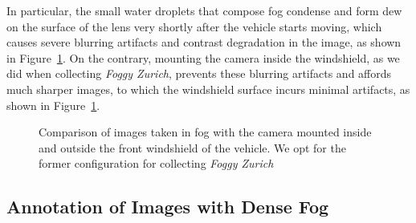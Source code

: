 \documentclass[twocolumn]{svjour3}          \smartqed  \usepackage{graphicx}
\begin{document}
In particular, the small water droplets that compose fog condense and form dew on the surface of the lens very shortly after the vehicle starts moving, which causes severe blurring artifacts and contrast degradation in the image, as shown in Figure~\ref{fig:windshield}. On the contrary, mounting the camera inside the windshield, as we did when collecting \emph{Foggy Zurich}, prevents these blurring artifacts and affords much sharper images, to which the windshield surface incurs minimal artifacts, as shown in Figure~\ref{fig:windshield}.

\begin{figure}
  \centering
  \hfil
  \caption{Comparison of images taken in fog with the camera mounted \protect{} inside and \protect{} outside the front windshield of the vehicle. We opt for the former configuration for collecting \emph{Foggy Zurich}}
  \label{fig:windshield}
\end{figure}

\subsection{Annotation of Images with Dense Fog}
\label{sec:dataset:annotations}
\end{document}
